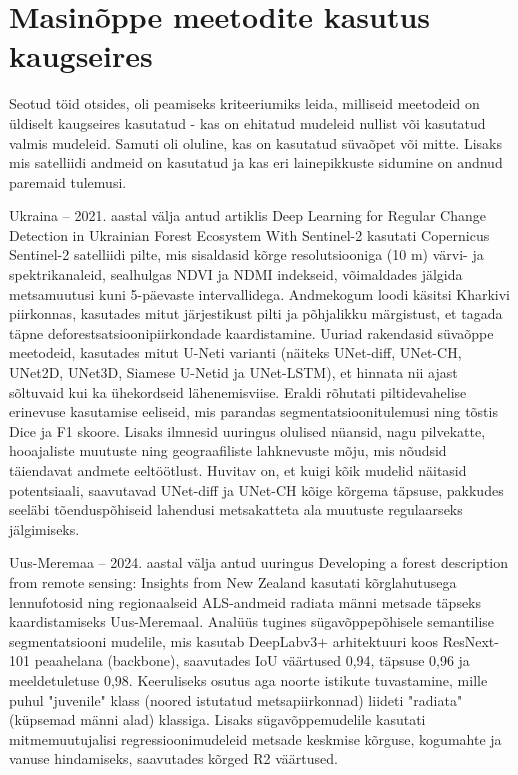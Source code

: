 \section{Masinõppe meetodite kasutus kaugseires}
Seotud töid otsides, oli peamiseks kriteeriumiks leida, milliseid meetodeid on
üldiselt kaugseires kasutatud - kas on ehitatud mudeleid nullist või kasutatud
valmis mudeleid. Samuti oli oluline, kas on kasutatud süvaõpet või mitte. Lisaks mis satelliidi andmeid on kasutatud ja kas eri lainepikkuste sidumine on andnud paremaid tulemusi.

Ukraina – 2021. aastal välja antud artiklis \glqq Deep Learning for Regular Change
Detection in Ukrainian Forest Ecosystem With Sentinel-2\grqq{} kasutati Copernicus Sentinel-2 satelliidi pilte, mis sisaldasid kõrge resolutsiooniga (10 m) värvi- ja spektrikanaleid, sealhulgas NDVI ja NDMI indekseid, võimaldades jälgida metsamuutusi kuni 5-päevaste intervallidega. Andmekogum loodi käsitsi Kharkivi piirkonnas, kasutades mitut järjestikust pilti ja põhjalikku märgistust, et tagada täpne deforestsatsioonipiirkondade kaardistamine. Uuriad rakendasid süvaõppe meetodeid, kasutades mitut U-Neti varianti (näiteks UNet-diff, UNet-CH, UNet2D, UNet3D, Siamese U-Netid ja UNet-LSTM), et hinnata nii ajast sõltuvaid kui ka ühekordseid lähenemisviise. Eraldi rõhutati piltidevahelise erinevuse kasutamise eeliseid, mis parandas segmentatsioonitulemusi ning tõstis Dice ja F1 skoore. Lisaks ilmnesid uuringus olulised nüansid, nagu pilvekatte, hooajaliste muutuste ning geograafiliste lahknevuste mõju, mis nõudsid täiendavat andmete eeltöötlust. Huvitav on, et kuigi kõik mudelid näitasid potentsiaali, saavutavad UNet-diff ja UNet-CH kõige kõrgema täpsuse, pakkudes seeläbi tõenduspõhiseid lahendusi metsakatteta ala muutuste regulaarseks jälgimiseks. \cite{isaienkovDeepLearningRegular2021}

Uus-Meremaa – 2024. aastal välja antud uuringus \glqq Developing a forest description from remote sensing: Insights from
New Zealand\grqq{} kasutati kõrglahutusega lennufotosid ning regionaalseid ALS-andmeid radiata männi metsade täpseks kaardistamiseks Uus-Meremaal. Analüüs tugines sügavõppepõhisele semantilise segmentatsiooni mudelile, mis kasutab DeepLabv3+ arhitektuuri koos ResNext-101 peaahelana (backbone), saavutades IoU väärtused 0,94, täpsuse 0,96 ja meeldetuletuse 0,98. Keeruliseks osutus aga noorte istikute tuvastamine, mille puhul "juvenile" klass (noored istutatud metsapiirkonnad) liideti "radiata" (küpsemad männi alad) klassiga. Lisaks sügavõppemudelile kasutati mitmemuutujalisi regressioonimudeleid metsade keskmise kõrguse, kogumahte ja vanuse hindamiseks, saavutades kõrged R2 väärtused. \cite{pearseDevelopingForestDescription2025}